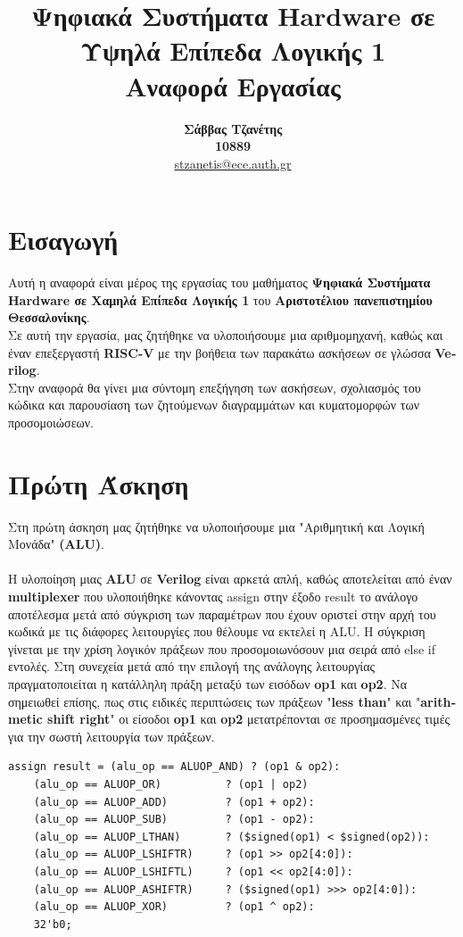 \documentclass[a4paper,12pt]{report}
\def\tl{\textlatin}
\begin{document}
\title{\textbf{Ψηφιακά Συστήματα \tl{Hardware} σε Υψηλά Επίπεδα Λογικής 1} \\ Αναφορά Εργασίας}
\author{\textbf{Σάββας Τζανέτης} \\
\textbf{10889} \\
\href{mailto:empty@auth.gr}{\tl{stzanetis@ece.auth.gr}}}
\maketitle

\chapter*{Εισαγωγή}
    \large Αυτή η αναφορά είναι μέρος της εργασίας του μαθήματος \textbf{Ψηφιακά Συστήματα \tl{Hardware} σε Χαμηλά Επίπεδα Λογικής 1} του \textbf{Αριστοτέλιου πανεπιστημίου Θεσσαλονίκης}. \\
    Σε αυτή την εργασία, μας ζητήθηκε να υλοποιήσουμε μια αριθμομηχανή, καθώς και έναν επεξεργαστή \textbf{\tl{RISC-V}} με την βοήθεια των παρακάτω ασκήσεων σε γλώσσα \textbf{\tl{Verilog}}. \\
    Στην αναφορά θα γίνει μια σύντομη επεξήγηση των ασκήσεων, σχολιασμός του κώδικα και παρουσίαση των ζητούμενων διαγραμμάτων και κυματομορφών των προσομοιώσεων.
\chapter{Πρώτη Άσκηση}
    \large Στη πρώτη άσκηση μας ζητήθηκε να υλοποιήσουμε μια "Αριθμητική και Λογική Μονάδα" \textbf{\tl{(ALU)}}. \\ \\
    Η υλοποίηση μιας \textbf{\tl{ALU}} σε \textbf{\tl{Verilog}} είναι αρκετά απλή, καθώς αποτελείται από έναν \textbf{\tl{multiplexer}} που υλοποιήθηκε κάνοντας \tl{assign} στην έξοδο \tl{result} το ανάλογο αποτέλεσμα μετά από σύγκριση των παραμέτρων που έχουν οριστεί στην αρχή του κωδικά με τις διάφορες λειτουργίες που θέλουμε να εκτελεί η \tl{ALU}. Η σύγκριση γίνεται με την χρίση λογικόν πράξεων που προσομοιωνόσουν μια σειρά από \tl{else if} εντολές. Στη συνεχεία μετά από την επιλογή της ανάλογης λειτουργίας πραγματοποιείται η κατάλληλη πράξη μεταξύ των εισόδων \textbf{\tl{op1}} και \textbf{\tl{op2}}. Να σημειωθεί επίσης, πως στις ειδικές περιπτώσεις των πράξεων "\textbf{\tl{less than}}" και "\textbf{\tl{arithmetic shift right}}" οι είσοδοι \textbf{\tl{op1}} και \textbf{\tl{op2}} μετατρέπονται σε προσημασμένες τιμές για την σωστή λειτουργία των πράξεων.
    \vspace{1cm}
    \begin{lstlisting}[style=verilog]
assign result = (alu_op == ALUOP_AND) ? (op1 & op2):
    (alu_op == ALUOP_OR)          ? (op1 | op2)
    (alu_op == ALUOP_ADD)         ? (op1 + op2):
    (alu_op == ALUOP_SUB)         ? (op1 - op2):
    (alu_op == ALUOP_LTHAN)       ? ($signed(op1) < $signed(op2)):
    (alu_op == ALUOP_LSHIFTR)     ? (op1 >> op2[4:0]):
    (alu_op == ALUOP_LSHIFTL)     ? (op1 << op2[4:0]):
    (alu_op == ALUOP_ASHIFTR)     ? ($signed(op1) >>> op2[4:0]):
    (alu_op == ALUOP_XOR)         ? (op1 ^ op2):
    32'b0;  
    \end{lstlisting}
\end{document}
